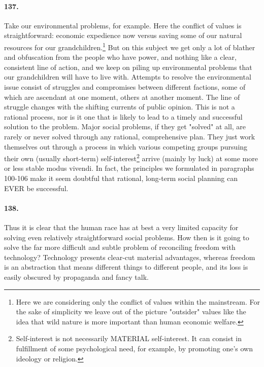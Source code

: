 \documentclass[12pt]{book}
\begin{document}
\paragraph{137.}  Take our environmental problems, for example. Here the conflict of values is straightforward: economic expedience now versus saving some of our natural resources for our grandchildren.\footnote{Here we are considering only the conflict of values within the mainstream. For the sake of simplicity we leave out of the picture "outsider" values like the idea that wild nature is more important than human economic welfare.} But on this subject we get only a lot of blather and obfuscation from the people who have power, and nothing like a clear, consistent line of action, and we keep on piling up environmental problems that our grandchildren will have to live with.  Attempts to resolve the environmental issue consist of struggles and compromises between different factions, some of which are ascendant at one moment, others at another moment. The line of struggle changes with the shifting currents of public opinion. This is not a rational process, nor is it one that is likely to lead to a timely and successful solution to the problem. Major social problems, if they get "solved" at all, are rarely or never solved through any rational, comprehensive plan. They just work themselves out through a process in which various competing groups pursuing their own (usually short-term) self-interest\footnote{Self-interest is not necessarily MATERIAL self-interest. It can consist in fulfillment of some psychological need, for example, by promoting one's own ideology or religion.} arrive (mainly by luck) at some more or less stable modus vivendi. In fact, the principles we formulated in paragraphs 100-106 make it seem doubtful that rational, long-term social planning can EVER be successful.


\paragraph{138.}  Thus it is clear that the human race has at best a very limited capacity for solving even relatively straightforward social problems. How then is it going to solve the far more difficult and subtle problem of reconciling freedom with technology? Technology presents clear-cut material advantages, whereas freedom is an abstraction that means different things to different people, and its loss is easily obscured by propaganda and fancy talk.
\end{document}
